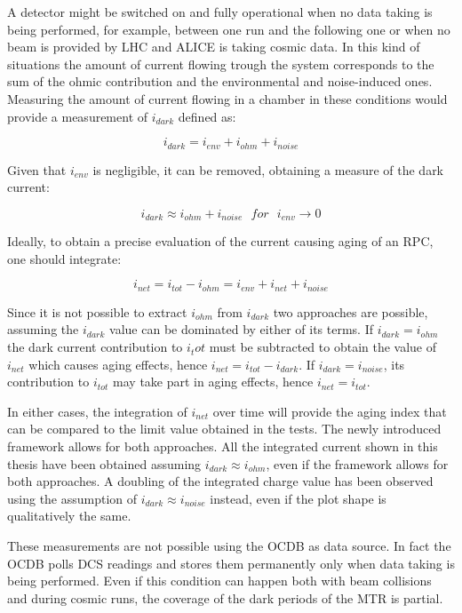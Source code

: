 A detector might be switched on and fully operational when no data taking is being performed, for example, between one run and the following one or when no beam is provided by LHC and ALICE is taking cosmic data.
In this kind of situations the amount of current flowing trough the system corresponds to the sum of the ohmic contribution and the environmental and noise-induced ones.
Measuring the amount of current flowing in a chamber in these conditions would provide a measurement of $i_{dark}$ defined as:

\begin{equation}
\label{eq:idark1}
i_{dark}=i_{env}+i_{ohm}+i_{noise}
\end{equation}

Given that $i_{env}$ is negligible, it can be removed, obtaining a measure of the dark current:

\begin{equation}
\label{eq:idark}
i_{dark}\approx i_{ohm}+i_{noise}\ \ \ for\ \ \ i_{env}\rightarrow0
\end{equation}

Ideally, to obtain a precise evaluation of the current causing aging of an RPC, one should integrate:

\begin{equation}
\label{eq:inet}
i_{net}=i_{tot}-i_{ohm}=i_{env}+i_{net}+i_{noise}
\end{equation}

Since it is not possible to extract $i_{ohm}$ from $i_{dark}$ two approaches are possible, assuming the $i_{dark}$ value can be dominated by either of its terms.
If $i_{dark}=i_{ohm}$ the dark current contribution to $i_tot$ must be subtracted to obtain the value of $i_{net}$ which causes aging effects, hence $i_{net}=i_{tot}-i_{dark}$.
If $i_{dark}=i_{noise}$, its contribution to $i_{tot}$ may take part in aging effects, hence $i_{net}=i_{tot}$.

In either cases, the integration of $i_{net}$ over time will provide the aging index that can be compared to the limit value obtained in the tests.
The newly introduced framework allows for both approaches.
All the integrated current shown in this thesis have been obtained assuming $i_{dark}\approx i_{ohm}$, even if the framework allows for both approaches.
A doubling of the integrated charge value has been observed using the assumption of $i_{dark}\approx i_{noise}$ instead, even if the plot shape is qualitatively the same.

These measurements are not possible using the OCDB as data source.
In fact the OCDB polls DCS readings and stores them permanently only when data taking is being performed.
Even if this condition can happen both with beam collisions and during cosmic runs, the coverage of the dark periods of the MTR is partial.

